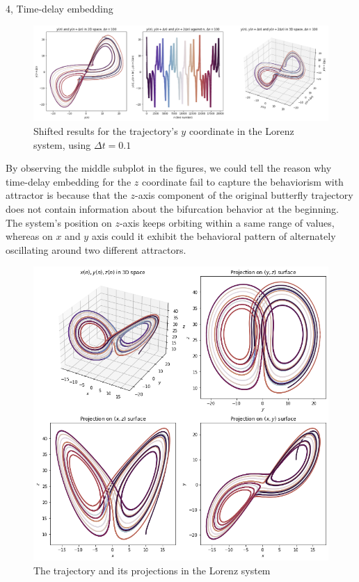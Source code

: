 \documentclass[10pt,a4paper]{article}
\begin{document}
\begin{task}{4, Time-delay embedding}
\begin{figure}[H]
    \centering
    \includegraphics[width=16cm]{images/task4-2-y-0.1.png}
    \caption{Shifted results for the trajectory's $y$ coordinate in the Lorenz system, using $\Delta t=0.1$}
    \label{task4-2-y}
\end{figure}

By observing the middle subplot in the figures, we could tell the reason why time-delay embedding for the $z$ coordinate fail to capture the behaviorism with attractor is because that the $z$-axis component of the original butterfly trajectory does not contain information about the bifurcation behavior at the beginning. The system's position on $z$-axis keeps orbiting within a same range of values, whereas on $x$ and $y$ axis could it exhibit the behavioral pattern of alternately oscillating around two different attractors. 

\begin{figure}[H]
    \centering
    \includegraphics[width=12cm]{images/task4-2-lorenz.png}
    \caption{The trajectory and its projections in the Lorenz system}
    \label{task4-2-lorenz}
\end{figure}


\end{task}
\end{document}
